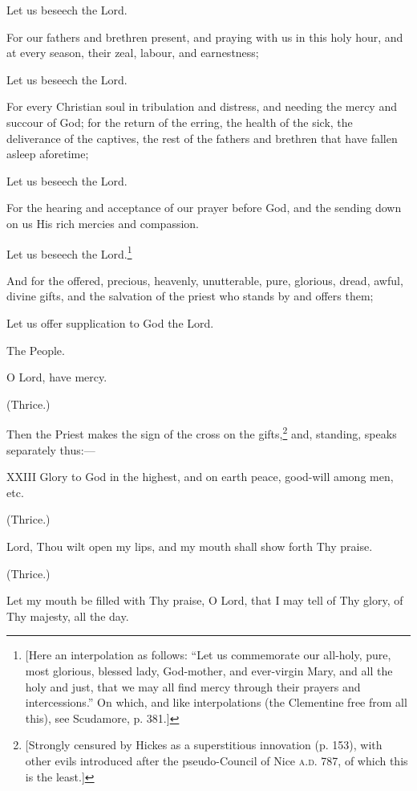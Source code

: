 Let us beseech the Lord.

For our fathers and brethren present, and praying with us in this holy hour, and at every season, their zeal, labour, and earnestness;

Let us beseech the Lord.

For every Christian soul in tribulation and distress, and needing the mercy and succour of God; for the return of the erring, the health of the sick, the deliverance of the captives, the rest of the fathers and brethren that have fallen asleep aforetime;

Let us beseech the Lord.

For the hearing and acceptance of our prayer before God, and the sending down on us His rich mercies and compassion.

Let us beseech the Lord.\footnote{\par{}  [Here an interpolation as follows: “Let us commemorate our all-holy, pure, most glorious, blessed lady, God-mother, and ever-virgin Mary, and all the holy and just, that we may all find mercy through their prayers and intercessions.” On which, and like interpolations (the Clementine free from all this), see Scudamore, p. 381.]}

And for the offered, precious, heavenly, unutterable, pure, glorious, dread, awful, divine gifts, and the salvation of the priest who stands by and offers them;

Let us offer supplication to God the Lord.

The People.

O Lord, have mercy.

(Thrice.)

Then the Priest makes the sign of the cross on the gifts,\footnote{\par{}  [Strongly censured by Hickes as a superstitious innovation (p. 153), with other evils introduced after the pseudo-Council of Nice \textsc{a.d.} 787, of which this is the least.]} and, standing, speaks separately thus:—

\textsc{XXIII} Glory to God in the highest, and on earth peace, good-will among men, etc.

(Thrice.)

Lord, Thou wilt open my lips, and my mouth shall show forth Thy praise.

(Thrice.)

Let my mouth be filled with Thy praise, O Lord, that I may tell of Thy glory, of Thy majesty, all the day.

